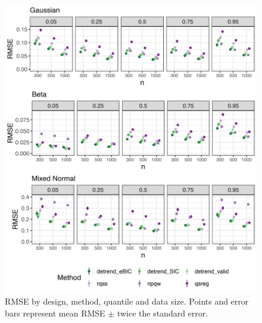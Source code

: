 \documentclass[12pt]{article}
\begin{document}
	\begin{figure}
		\includegraphics[width=\linewidth]{Figures/sim_metrics.png}	
		\caption{RMSE by design, method, quantile and data size. Points and error bars represent mean RMSE $\pm$ twice the standard error.}
		\label{fig:quantile_mse}
	\end{figure}
\end{document}
